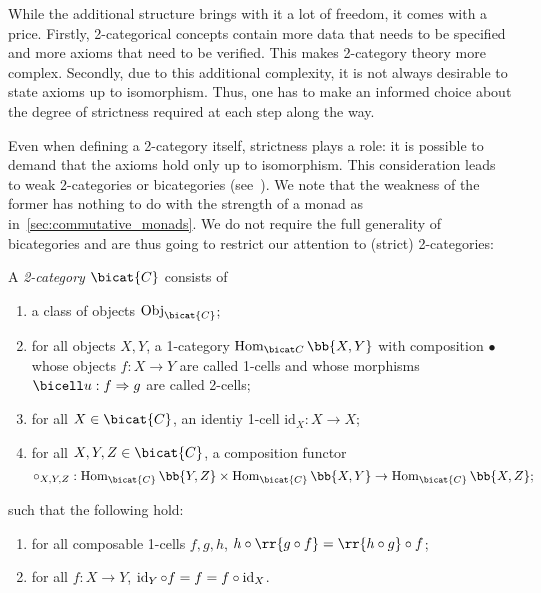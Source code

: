 While the additional structure brings with it a lot of freedom, it comes with a price.
Firstly, 2-categorical concepts contain more data that needs to be specified and
more axioms that need to be verified. This makes 2-category theory more complex.
Secondly, due to this additional complexity, it is not always desirable to state axioms up to
isomorphism. Thus, one has to make an informed choice about the degree of strictness
required at each step along the way.

Even when defining a 2-category itself, strictness plays a role: it is possible to
demand that the axioms hold only up to isomorphism. This consideration leads to weak
2-categories or bicategories (see~\cite{leinster1998}). We note that the weakness of the former
has nothing to do with the strength of a monad as in~\ref{sec:commutative_monads}.
We do not require the full generality of bicategories and are thus going
to restrict our attention to (strict) 2-categories:

\begin{definition}\label{def:2category}
  A \emph{2-category} $\bicat{C}$ consists of \begin{enumerate}
    \item a class of objects $\Obj_{\bicat{C}}$;
    \item for all objects $X,Y$, a 1-category $\Hom_{\bicat C}\bb{X,Y}$ with
      composition $\bullet$ whose objects $f:X\to Y$ are called 1-cells and
      whose morphisms $\bicell u:f\Rightarrow g$ are called 2-cells;
    \item for all $X\in\bicat{C}$, an identiy 1-cell $\text{id}_X:X\to X$;
    \item for all $X,Y,Z\in\bicat{C}$, a composition functor
      \begin{equation}
        \label{eq:bicategory_composition}
        \circ_{X,Y,Z}:\Hom_{\bicat{C}}\bb{Y,Z}\times\Hom_{\bicat{C}}\bb{X,Y}
        \to\Hom_{\bicat{C}}\bb{X,Z};
      \end{equation}
  \end{enumerate}
  such that the following hold:
  \begin{enumerate}
    \item for all composable 1-cells $f,g,h$,
      $h\circ\rr{g\circ f}=\rr{h\circ g}\circ f$;
    \item for all $f:X\to Y$, $\operatorname{id}_Y\circ f = f = f\circ \operatorname{id}_X$.
  \end{enumerate}
\end{definition}


